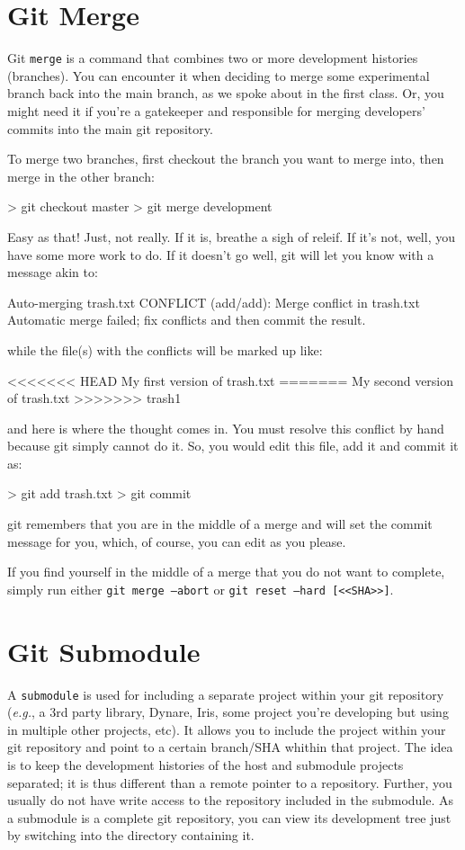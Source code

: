 \documentclass[10pt,letterpaper]{article}
\begin{document}
\section{Git Merge}
Git \texttt{merge} is a command that combines two or more development histories (branches). You can encounter it when deciding to merge some experimental branch back into the main branch, as we spoke about in the first class. Or, you might need it if you're a gatekeeper and responsible for merging developers' commits into the main git repository.

To merge two branches, first checkout the branch you want to merge into, then merge in the other branch:
\begin{code}
> git checkout master
> git merge development
\end{code}

Easy as that! Just, not really. If it is, breathe a sigh of releif. If it's not, well, you have some more work to do. If it doesn't go well, git will let you know with a message akin to:
\begin{code}
Auto-merging trash.txt
CONFLICT (add/add): Merge conflict in trash.txt
Automatic merge failed; fix conflicts and then commit the result.
\end{code}
\noindent while the file(s) with the conflicts will be marked up like:
\begin{code}
<<<<<<< HEAD
My first version of trash.txt
=======
My second version of trash.txt
>>>>>>> trash1
\end{code}
\noindent and here is where the thought comes in. You must resolve this conflict by hand because git simply cannot do it. So, you would edit this file, add it and commit it as:
\begin{code}
> git add trash.txt
> git commit
\end{code}
\noindent git remembers that you are in the middle of a merge and will set the commit message for you, which, of course, you can edit as you please.

If you find yourself in the middle of a merge that you do not want to complete, simply run either \texttt{git merge --abort} or \texttt{git reset --hard [<<SHA>>]}.


\section{Git Submodule}

A \texttt{submodule} is used for including a separate project within your git repository (\textit{e.g.}, a 3rd party library, Dynare, Iris, some project you're developing but using in multiple other projects, etc). It allows you to include the project within your git repository and point to a certain branch/SHA whithin that project. The idea is to keep the development histories of the host and submodule projects separated; it is thus different than a remote pointer to a repository. Further, you usually do not have write access to the repository included in the submodule. As a submodule is a complete git repository, you can view its development tree just by switching into the directory containing it.
\end{document}
